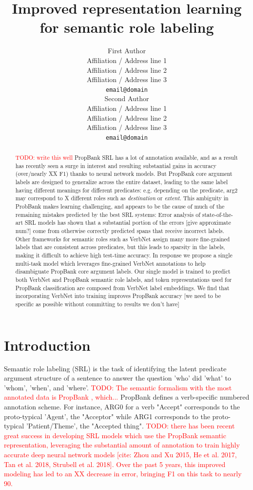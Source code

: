 \documentclass[11pt,a4paper]{article}
\title{Improved representation learning for semantic role labeling}
\author{First Author \\
  Affiliation / Address line 1 \\
  Affiliation / Address line 2 \\
  Affiliation / Address line 3 \\
  {\tt email@domain} \\\And
  Second Author \\
  Affiliation / Address line 1 \\
  Affiliation / Address line 2 \\
  Affiliation / Address line 3 \\
  {\tt email@domain} \\}
\date{}
\newcommand{\emmatodo}[1]{\textcolor{red}{TODO: #1}}
\begin{document}
\maketitle
\begin{abstract}
  \emmatodo{write this well} PropBank SRL has a lot of annotation available, and as a result has recently seen a surge in interest and resulting substantial gains in accuracy (over/nearly XX F1) thanks to neural network models. But PropBank core argument labels are designed to generalize across the entire dataset, leading to the same label having different meanings for different predicates: e.g. depending on the predicate, {\sc arg2} may correspond to X different roles such as  \emph{destination} or \emph{extent}. This ambiguity in ProbBank makes learning challenging, and appears to be the cause of much of the remaining mistakes predicted by the best SRL systems: Error analysis of state-of-the-art SRL models has shown that a substantial portion of the errors [give approximate num?] come from otherwise correctly predicted spans that receive incorrect labels. Other frameworks for semantic roles such as VerbNet assign many more fine-grained labels that are consistent across predicates, but this leads to sparsity in the labels, making it difficult to achieve high test-time accuracy. In response we propose a single multi-task model which leverages fine-grained VerbNet annotations to help disambiguate PropBank core argument labels. Our single model is trained to predict both VerbNet and PropBank semantic role labels, and token representations used for PropBank classification are composed from VerbNet label embeddings. We find that incorporating VerbNet into training improves PropBank accuracy [we need to be specific as possible without committing to results we don't have]
\end{abstract}


\section{Introduction}
Semantic role labeling (SRL) is the task of identifying the latent predicate argument structure of a sentence to answer the question 'who' did 'what' to 'whom', 'when', and 'where'. \emmatodo{The semantic formalism with the most annotated data is PropBank \cite{palmer2005proposition}, which...} PropBank defines a verb-specific numbered annotation scheme. For instance, ARG0 for a verb "Accept" corresponds to the proto-typical 'Agent', the "Acceptor" while ARG1 corresponds to the proto-typical 'Patient/Theme', the "Accepted thing". \emmatodo{there has been recent great success in developing SRL models which use the PropBank  semantic representation, leveraging the substantial amount of annotation to train highly accurate deep neural network models [cite: Zhou and Xu 2015, He et al. 2017, Tan et al. 2018, Strubell et al. 2018]. Over the past 5 years, this improved modeling has led to an XX decrease in error, bringing F1 on this task to nearly 90.}
\end{document}
